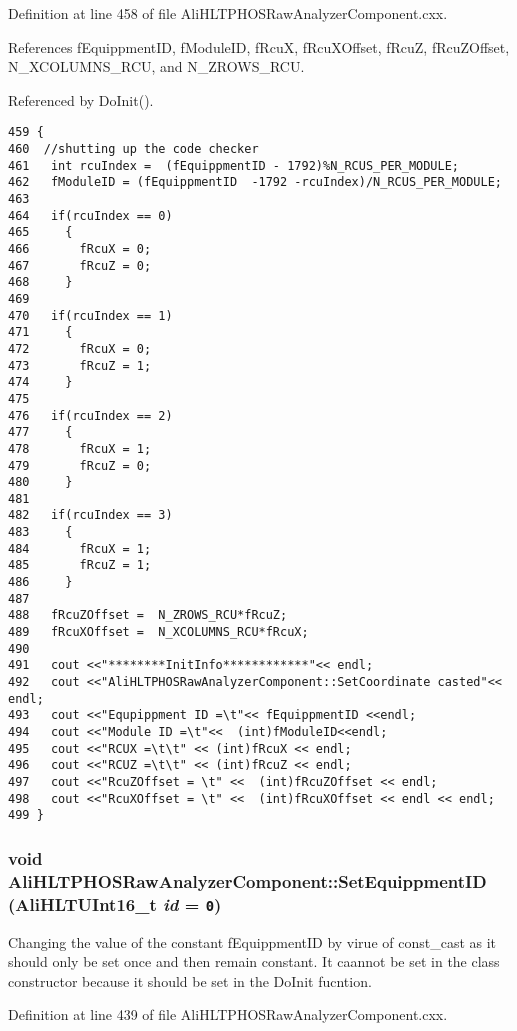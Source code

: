 Definition at line 458 of file Ali\-HLTPHOSRaw\-Analyzer\-Component.cxx.

References f\-Equippment\-ID, f\-Module\-ID, f\-Rcu\-X, f\-Rcu\-XOffset, f\-Rcu\-Z, f\-Rcu\-ZOffset, N\_\-XCOLUMNS\_\-RCU, and N\_\-ZROWS\_\-RCU.

Referenced by Do\-Init().

\footnotesize\begin{verbatim}459 {
460  //shutting up the code checker
461   int rcuIndex =  (fEquippmentID - 1792)%N_RCUS_PER_MODULE;
462   fModuleID = (fEquippmentID  -1792 -rcuIndex)/N_RCUS_PER_MODULE;
463   
464   if(rcuIndex == 0)
465     {
466       fRcuX = 0; 
467       fRcuZ = 0;
468     }
469 
470   if(rcuIndex == 1)
471     {
472       fRcuX = 0; 
473       fRcuZ = 1;
474     }
475  
476   if(rcuIndex == 2)
477     {
478       fRcuX = 1; 
479       fRcuZ = 0;
480     }
481 
482   if(rcuIndex == 3)
483     {
484       fRcuX = 1; 
485       fRcuZ = 1;
486     }
487 
488   fRcuZOffset =  N_ZROWS_RCU*fRcuZ;
489   fRcuXOffset =  N_XCOLUMNS_RCU*fRcuX;
490 
491   cout <<"********InitInfo************"<< endl;
492   cout <<"AliHLTPHOSRawAnalyzerComponent::SetCoordinate casted"<< endl;
493   cout <<"Equpippment ID =\t"<< fEquippmentID <<endl;
494   cout <<"Module ID =\t"<<  (int)fModuleID<<endl;
495   cout <<"RCUX =\t\t" << (int)fRcuX << endl;
496   cout <<"RCUZ =\t\t" << (int)fRcuZ << endl;
497   cout <<"RcuZOffset = \t" <<  (int)fRcuZOffset << endl;
498   cout <<"RcuXOffset = \t" <<  (int)fRcuXOffset << endl << endl;
499 }
\end{verbatim}\normalsize 


\subsubsection{\setlength{\rightskip}{0pt plus 5cm}void Ali\-HLTPHOSRaw\-Analyzer\-Component::Set\-Equippment\-ID ({\bf Ali\-HLTUInt16\_\-t} {\em id} = {\tt 0})}\label{classAliHLTPHOSRawAnalyzerComponent_a9}


Changing the value of the constant f\-Equippment\-ID by virue of const\_\-cast as it should only be set once and then remain constant. It caannot be set in the class constructor because it should be set in the Do\-Init fucntion. 

Definition at line 439 of file Ali\-HLTPHOSRaw\-Analyzer\-Component.cxx.

